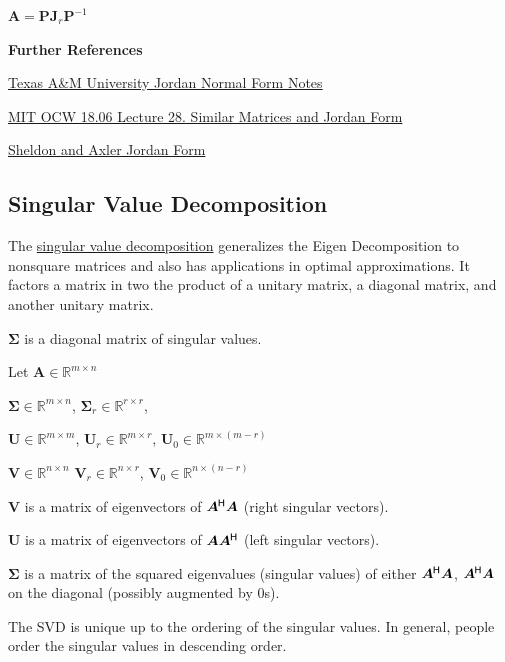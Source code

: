 \documentclass[11pt]{article}
\begin{document}
  \(\bm{A} = \bm{P}\bm{J}_r\bm{P}^{-1}\)

  \textbf{Further References}

  \href{https://www.math.tamu.edu/~dallen/m640_03c/lectures/chapter8.pdf}{Texas A&M University Jordan Normal Form Notes}

  \href{https://www.youtube.com/watch?v=TSdXJw83kyA}{MIT OCW 18.06 Lecture 28. Similar Matrices and Jordan Form}

  \href{https://www.youtube.com/watch?v=jWo65wklbYM}{Sheldon and Axler Jordan Form}

  \pagebreak

  \subsection{Singular Value Decomposition}

  The \href{https://www.wikiwand.com/en/Singular_value_decomposition}{singular value decomposition}
  generalizes the Eigen Decomposition to nonsquare matrices and also has
  applications in optimal approximations. It factors a matrix in two the product of a unitary matrix, a
  diagonal matrix, and another unitary matrix.

  \(\bm{\Sigma}\) is a diagonal matrix of singular values.

  Let \(\bm{A} \in \mathbb{R}^{m \times n}\)

  \(\bm{\Sigma} \in \mathbb{R}^{m \times n}\),
  \(\bm{\Sigma}_r \in \mathbb{R}^{r \times r}\),

  \(\bm{U} \in \mathbb{R}^{m \times m}\),
  \(\bm{U}_r \in \mathbb{R}^{m \times r}\),
  \(\bm{U}_0 \in \mathbb{R}^{m \times (m - r)}\)

  \(\bm{V} \in \mathbb{R}^{n \times n}\)
  \(\bm{V}_r \in \mathbb{R}^{n \times r}\),
  \(\bm{V}_0 \in \mathbb{R}^{n \times (n - r)}\)

  \vspace{12pt}

  \(\bm{V}\) is a matrix of eigenvectors of \(\bm{A}^{\mkern-1.5mu\mathsf{H}}\bm{A}\) (right singular vectors).

  \(\bm{U}\) is a matrix of eigenvectors of \(\bm{A}\bm{A}^{\mkern-1.5mu\mathsf{H}}\) (left singular vectors).

  \(\bm{\Sigma}\) is a matrix of the squared eigenvalues (singular values) of either
  \(\bm{A}^{\mkern-1.5mu\mathsf{H}}\bm{A}\), \(\bm{A}^{\mkern-1.5mu\mathsf{H}}\bm{A}\) on the diagonal (possibly augmented by 0s).

  The SVD is unique up to the ordering of the singular values. In general, people
  order the singular values in descending order.
\end{document}
